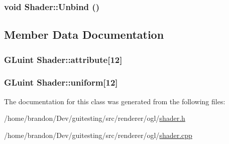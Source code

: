 \hypertarget{class_shader_a53965ba78cf36b664e1f53d337b1b0b}{
\subsubsection[{Unbind}]{\setlength{\rightskip}{0pt plus 5cm}void Shader::Unbind ()}}
\label{class_shader_a53965ba78cf36b664e1f53d337b1b0b}




\subsection{Member Data Documentation}
\hypertarget{class_shader_f0fcdb46ec6b628a3d29412c33a8b18c}{
\subsubsection[{attribute}]{\setlength{\rightskip}{0pt plus 5cm}GLuint {\bf Shader::attribute}\mbox{[}12\mbox{]}}}
\label{class_shader_f0fcdb46ec6b628a3d29412c33a8b18c}


\hypertarget{class_shader_2aef3970f9638e967846799ba82469a7}{
\subsubsection[{uniform}]{\setlength{\rightskip}{0pt plus 5cm}GLuint {\bf Shader::uniform}\mbox{[}12\mbox{]}}}
\label{class_shader_2aef3970f9638e967846799ba82469a7}




The documentation for this class was generated from the following files:\begin{CompactItemize}
\item 
/home/brandon/Dev/guitesting/src/renderer/ogl/\hyperlink{shader_8h}{shader.h}\item 
/home/brandon/Dev/guitesting/src/renderer/ogl/\hyperlink{shader_8cpp}{shader.cpp}\end{CompactItemize}
